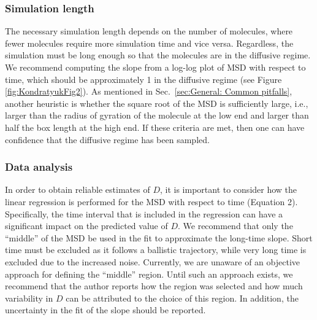 \documentclass[9pt,bestpractices]{livecoms}
\begin{document}
\subsubsection{Simulation length} \label{sec:Self-Diffusivity:Einstein: Simulation length}

The necessary simulation length depends on the number of molecules, where fewer molecules require more simulation time and vice versa. %
Regardless, the simulation must be long enough so that the molecules are in the diffusive regime. We recommend computing the slope from a log-log plot of MSD with respect to time, which should be approximately 1 in the diffusive regime (see Figure \ref{fig:KondratyukFig2}). As mentioned in Sec.\ \ref{sec:General: Common pitfalls}, another heuristic is whether the square root of the MSD is sufficiently large, i.e., larger than the radius of gyration of the molecule at the low end and larger than half the box length at the high end. If these criteria are met, then one can have confidence that the diffusive regime has been sampled.


\subsubsection{Data analysis} \label{sec:Self-Diffusivity:Einstein: Data analysis}

In order to obtain reliable estimates of $D$, it is important to consider how the linear regression is performed for the MSD with respect to time (Equation 2). Specifically, the time interval that is included in the regression can have a significant impact on the predicted value of $D$. We recommend that only the ``middle'' of the MSD be used in the fit to approximate the long-time slope. Short time must be excluded as it follows a ballistic trajectory, while very long time is excluded due to the increased noise. Currently, we are unaware of an objective approach for defining the ``middle'' region. Until such an approach exists, we recommend that the author reports how the region was selected and how much variability in $D$ can be attributed to the choice of this region. In addition, the uncertainty in the fit of the slope should be reported. 
\end{document}

